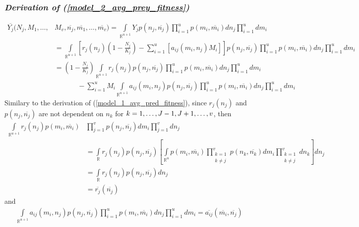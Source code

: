 \documentclass{amsart}
\theoremstyle{definition}
\theoremstyle{remark}
\numberwithin{equation}{section}
\begin{document}
\subsubsection*{\textbf{\textit{Derivation of (\ref{model_2_avg_prey_fitness})}}}
\begin{align*}
	\overline{Y_j}(N_j, M_1, \dots, &M_v, \overline{n_j}, \overline{m_1}, \dots, \overline{m_v}) = \int\limits_{\mathbb{R}^{u+1}}^{}Y_jp(n_j, \overline{n_j})\prod\limits_{i = 1}^{u}p(m_i, \overline{m_i})dn_j\prod\limits_{i = 1}^{u}dm_i \\
	&= \int\limits_{\mathbb{R}^{u+1}}\left[r_j(n_j)\left(1 - \frac{N_j}{K_j}\right) - \sum\limits_{i = 1}^{u}\left[a_{ij}(m_i, n_j)M_i\right]\right]p(n_j, \overline{n_j})\prod\limits_{i = 1}^{u}p(m_i, \overline{m_i})dn_j\prod\limits_{i = 1}^{u}dm_i \\
	&= \left(1 - \frac{N_j}{K_j}\right)\int\limits_{\mathbb{R}^{u+1}}r_j(n_j)p(n_j, \overline{n_j})\prod\limits_{i = 1}^{u}p(m_i, \overline{m_i})dn_j\prod\limits_{i = 1}^{u}dm_i \\
	&\ \ \ \ \ \ \ \ \ \ \ \ \ \ \ - \sum\limits_{i=1}^{u}M_i\int\limits_{\mathbb{R}^{u+1}}a_{ij}(m_i, n_j)p(n_j, \overline{n_j})\prod\limits_{i = 1}^{u}p(m_i, \overline{m_i})dn_j\prod\limits_{i = 1}^{u}dm_i
\end{align*}
Similary to the derivation of (\ref{model_1_avg_pred_fitness}), since $r_j(n_j)$ and $p(n_j, \overline{n_j})$ are not dependent on $n_k$ for $k = 1, \dots, J-1, J+1, \dots, v$, then 
\begin{align*}
	\int\limits_{\mathbb{R}^{u+1}}^{}r_j(n_j)p(m_i, \overline{m_i})&\prod\limits_{j = 1}^{v}p(n_j, \overline{n_j})dm_i\prod\limits_{j = 1}^{v}dn_j \\
	&= \int\limits_{\mathbb{R}}r_j(n_j)p(n_j, \overline{n_j})\left[\int\limits_{\mathbb{R}^{u}}p(m_i, \overline{m_i})\prod\limits_{\substack{k=1\\k\neq j}}^{v}p(n_k, \overline{n_k})dm_i\prod\limits_{\substack{k=1\\k\neq j}}^{v}dn_k\right]dn_j \\
	&= \int\limits_{\mathbb{R}}r_j(n_j)p(n_j, \overline{n_j})dn_j \\
	&= \overline{r_j}(\overline{n_j})
\end{align*}
and
\begin{align*}
	\int\limits_{\mathbb{R}^{u+1}}a_{ij}(m_i, n_j)p(n_j, \overline{n_j})\prod\limits_{i = 1}^{u}p(m_i, \overline{m_i})dn_j\prod\limits_{i = 1}^{u}dm_i = \overline{a_{ij}}(\overline{m_i}, \overline{n_j})
\end{align*}
\end{document}
